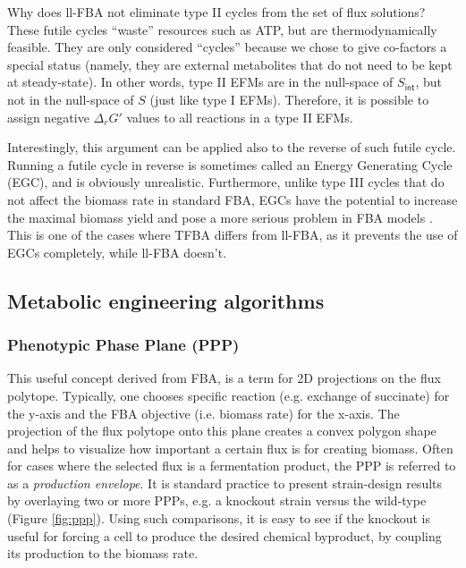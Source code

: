 \documentclass[10pt,a4paper]{article}
\newcommand{\mymatrix}[1]{#1}
\newcommand{\stoichmat}{\mymatrix{S}}
\newcommand{\stoichmatint}{\mymatrix{S}_{\mathsf{int}}}
\begin{document}
Why does ll-FBA not eliminate type II cycles from the set of flux solutions? These futile cycles ``waste'' resources such as ATP, but are thermodynamically feasible. They are only considered ``cycles'' because we chose to give co-factors a special status (namely, they are external metabolites that do not need to be kept at steady-state). In other words, type II EFMs are in the null-space of $\stoichmatint$, but not in the null-space of $\stoichmat$ (just like type I EFMs). Therefore, it is possible to assign negative $\Delta_r G'$ values to all reactions in a type II EFMs.

Interestingly, this argument can be applied also to the reverse of such futile cycle. Running a futile cycle in reverse is sometimes called an Energy Generating Cycle (EGC), and is obviously unrealistic. Furthermore, unlike type III cycles that do not affect the biomass rate in standard FBA, EGCs have the potential to increase the maximal biomass yield and pose a more serious problem in FBA models \cite{fritzemeier_erroneous_2017-2}. This is one of the cases where TFBA differs from ll-FBA, as it prevents the use of EGCs completely, while ll-FBA doesn't.

\subsection{Metabolic engineering algorithms}

\subsubsection{Phenotypic Phase Plane (PPP)}
This useful concept derived from FBA, is a term for 2D projections on the flux polytope. Typically, one chooses specific reaction (e.g. exchange of succinate) for the y-axis and the FBA objective (i.e. biomass rate) for the x-axis. The projection of the flux polytope onto this plane creates a convex polygon shape and helps to visualize how important a certain flux is for creating biomass. Often for cases where the selected flux is a fermentation product, the PPP is referred to as a \textit{production envelope}. It is standard practice to present strain-design results by overlaying two or more PPPs, e.g. a knockout strain versus the wild-type (Figure \ref{fig:ppp}). Using such comparisons, it is easy to see if the knockout is useful for forcing a cell to produce the desired chemical byproduct, by coupling its production to the biomass rate.
\end{document}
